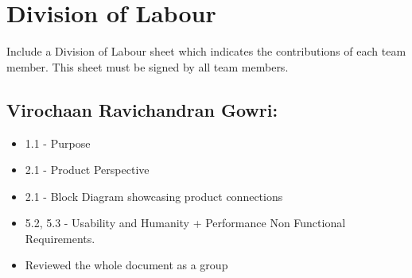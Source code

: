 \documentclass[]{article}
\begin{document}


\appendix
\section{Division of Labour}
\label{sec:division_of_labour}
Include a Division of Labour sheet which indicates the contributions of each team member. This sheet must be signed by all team members.
\subsection*{Virochaan Ravichandran Gowri:}
\begin{itemize}
	\item 1.1 - Purpose
	\item 2.1 - Product Perspective
	\item 2.1 - Block Diagram showcasing product connections
	\item 5.2, 5.3 - Usability and Humanity + Performance Non Functional Requirements.
	\item Reviewed the whole document as a group
\end{itemize}


\end{document}
